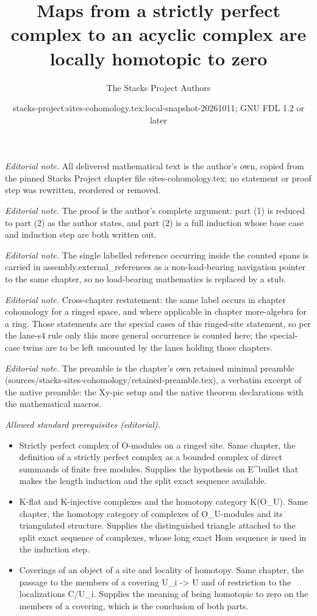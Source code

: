 \documentclass[10pt,a4paper]{amsart}
\title{Maps from a strictly perfect complex to an acyclic complex are locally homotopic to zero}
\author{The Stacks Project Authors}
\date{stacks-project:sites-cohomology.tex:local-snapshot-20261011; GNU FDL 1.2 or later}
\theoremstyle{plain}
\theoremstyle{definition}
\theoremstyle{remark}
\numberwithin{equation}{subsection}
\begin{document}
\maketitle
\noindent\textit{Editorial note.} All delivered mathematical text is the author's own, copied from the pinned Stacks Project chapter file sites-cohomology.tex; no statement or proof step was rewritten, reordered or removed.\par\medskip
\noindent\textit{Editorial note.} The proof is the author's complete argument: part (1) is reduced to part (2) as the author states, and part (2) is a full induction whose base case and induction step are both written out.\par\medskip
\noindent\textit{Editorial note.} The single labelled reference occurring inside the counted spans is carried in assembly.external\_references as a non-load-bearing navigation pointer to the same chapter, so no load-bearing mathematics is replaced by a stub.\par\medskip
\noindent\textit{Editorial note.} Cross-chapter restatement: the same label occurs in chapter cohomology for a ringed space, and where applicable in chapter more-algebra for a ring. Those statements are the special cases of this ringed-site statement, so per the lane-s4 rule only this more general occurrence is counted here; the special-case twins are to be left uncounted by the lanes holding those chapters.\par\medskip
\noindent\textit{Editorial note.} The preamble is the chapter's own retained minimal preamble (sources/stacks-sites-cohomology/retained-preamble.tex), a verbatim excerpt of the native preamble: the Xy-pic setup and the native theorem declarations with the mathematical macros.\par\medskip
\noindent\textit{Allowed standard prerequisites (editorial).}\begin{itemize}
\item Strictly perfect complex of O-modules on a ringed site. Same chapter, the definition of a strictly perfect complex as a bounded complex of direct summands of finite free modules. Supplies the hypothesis on E\textasciicircum{}bullet that makes the length induction and the split exact sequence available.
\item K-flat and K-injective complexes and the homotopy category K(O\_U). Same chapter, the homotopy category of complexes of O\_U-modules and its triangulated structure. Supplies the distinguished triangle attached to the split exact sequence of complexes, whose long exact Hom sequence is used in the induction step.
\item Coverings of an object of a site and locality of homotopy. Same chapter, the passage to the members of a covering U\_i -> U and of restriction to the localizations C/U\_i. Supplies the meaning of being homotopic to zero on the members of a covering, which is the conclusion of both parts.
\end{itemize}\medskip
\end{document}
